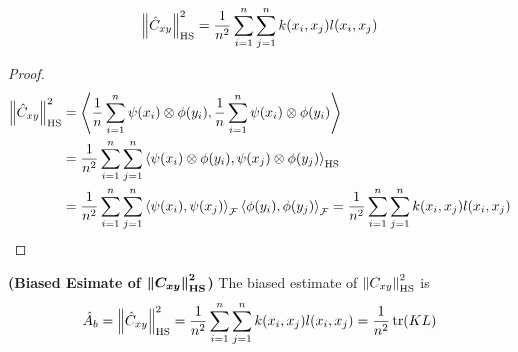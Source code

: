 \begin{lemma}
    \label{lem:emph-C-xy}
    \begin{equation*}
        \left\lVert\hat{C}_{xy}\right\rVert^2_{\operatorname{HS}} = \frac{1}{n^2}\sum^n_{i=1}\sum^n_{j=1}k(x_i, x_j)l(x_i, x_j)
    \end{equation*}
\end{lemma}
\begin{proof}
    \begin{equation*}
    \begin{aligned}
        \left\lVert\hat{C}_{xy}\right\rVert^2_{\operatorname{HS}} &= \left\langle \frac{1}{n}\sum^n_{i=1}\psi(x_i)\otimes\phi(y_i), \frac{1}{n}\sum^n_{i=1}\psi(x_i)\otimes\phi(y_i) \right\rangle \\ 
        &= \frac{1}{n^2}\sum^n_{i=1}\sum^n_{j=1}\left\langle \psi(x_i)\otimes\phi(y_i),\psi(x_j)\otimes\phi(y_j) \right\rangle_{\operatorname{HS}} \\
        &= \frac{1}{n^2}\sum^n_{i=1}\sum^n_{j=1}\left\langle \psi(x_i), \psi(x_j) \right\rangle_{\mathcal{F}}\left\langle \phi(y_i), \phi(y_j) \right\rangle_{\mathcal{F}} = \frac{1}{n^2}\sum^n_{i=1}\sum^n_{j=1}k(x_i, x_j)l(x_i, x_j) 
    \end{aligned}
    \end{equation*}
\end{proof}

\begin{definition}{\textbf{(Biased Esimate of $\boldsymbol{\left\lVert C_{xy}\right\rVert^2_{\operatorname{HS}}}$)}}
    The biased estimate of $\left\lVert C_{xy}\right\rVert^2_{\operatorname{HS}}$ is 
    \begin{equation*}
        \hat{A}_b = \left\lVert\hat{C}_{xy}\right\rVert^2_{\operatorname{HS}} = \frac{1}{n^2}\sum^n_{i=1}\sum^n_{j=1}k(x_i, x_j)l(x_i, x_j) = \frac{1}{n^2}\operatorname{tr}(KL)
    \end{equation*}
\end{definition}

